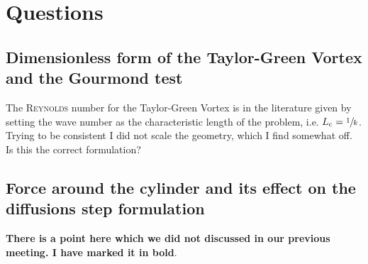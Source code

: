 \documentclass[]{scrartcl}
\begin{document}
\section{Questions}
\subsection{Dimensionless form of the Taylor-Green Vortex and the Gourmond test}
The \textsc{Reynolds} number for the Taylor-Green Vortex is in the literature given by setting the wave number as the characteristic length of the problem, i.e. $L_\textrm{c} = \sfrac{1}{k}$. Trying to be consistent I did not scale the geometry, which I find somewhat off. Is this the correct formulation?
\subsection{Force around the cylinder and its effect on the diffusions step formulation}
\textbf{There is a point here which we did not discussed in our previous meeting. I have marked it in bold}.
\end{document}

